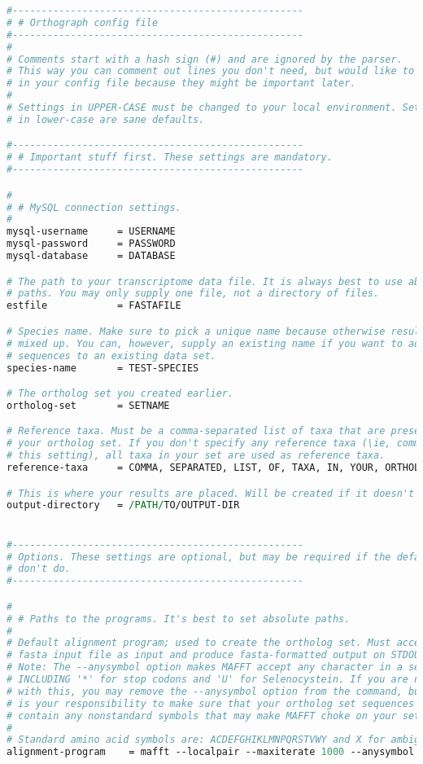 \begin{lstlisting}[language=perl]
#--------------------------------------------------
# # Orthograph config file
#-------------------------------------------------- 
#
# Comments start with a hash sign (#) and are ignored by the parser.
# This way you can comment out lines you don't need, but would like to keep
# in your config file because they might be important later.
#
# Settings in UPPER-CASE must be changed to your local environment. Settings
# in lower-case are sane defaults.

#--------------------------------------------------
# # Important stuff first. These settings are mandatory.
#-------------------------------------------------- 

#
# # MySQL connection settings.
#
mysql-username     = USERNAME
mysql-password     = PASSWORD
mysql-database     = DATABASE

# The path to your transcriptome data file. It is always best to use absolute
# paths. You may only supply one file, not a directory of files.
estfile            = FASTAFILE

# Species name. Make sure to pick a unique name because otherwise results get
# mixed up. You can, however, supply an existing name if you want to add
# sequences to an existing data set. 
species-name       = TEST-SPECIES

# The ortholog set you created earlier.
ortholog-set       = SETNAME

# Reference taxa. Must be a comma-separated list of taxa that are present in
# your ortholog set. If you don't specify any reference taxa (\ie, comment out
# this setting), all taxa in your set are used as reference taxa. 
reference-taxa     = COMMA, SEPARATED, LIST, OF, TAXA, IN, YOUR, ORTHOLOG, SET

# This is where your results are placed. Will be created if it doesn't exist.
output-directory   = /PATH/TO/OUTPUT-DIR


#--------------------------------------------------
# Options. These settings are optional, but may be required if the defaults
# don't do.
#-------------------------------------------------- 

#
# # Paths to the programs. It's best to set absolute paths.
#
# Default alignment program; used to create the ortholog set. Must accept a
# fasta input file as input and produce fasta-formatted output on STDOUT. 
# Note: The --anysymbol option makes MAFFT accept any character in a sequence,
# INCLUDING '*' for stop codons and 'U' for Selenocystein. If you are not OK
# with this, you may remove the --anysymbol option from the command, but then it
# is your responsibility to make sure that your ortholog set sequences do not
# contain any nonstandard symbols that may make MAFFT choke on your set.
#
# Standard amino acid symbols are: ACDEFGHIKLMNPQRSTVWY and X for ambiguity.
alignment-program    = mafft --localpair --maxiterate 1000 --anysymbol


\end{lstlisting}
